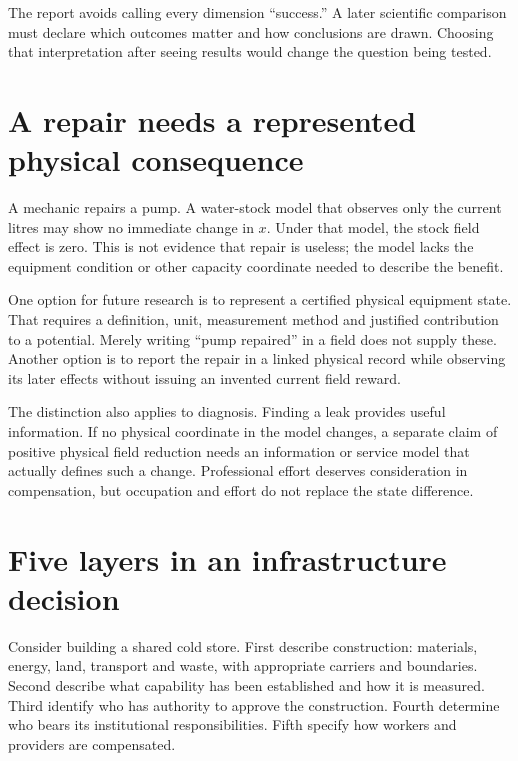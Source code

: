 The report avoids calling every dimension ``success.'' A later scientific comparison must declare which outcomes matter and how conclusions are drawn. Choosing that interpretation after seeing results would change the question being tested.


\section{A repair needs a represented physical consequence}
A mechanic repairs a pump. A water-stock model that observes only the current litres may show no immediate change in $x$. Under that model, the stock field effect is zero. This is not evidence that repair is useless; the model lacks the equipment condition or other capacity coordinate needed to describe the benefit.

One option for future research is to represent a certified physical equipment state. That requires a definition, unit, measurement method and justified contribution to a potential. Merely writing ``pump repaired'' in a field does not supply these. Another option is to report the repair in a linked physical record while observing its later effects without issuing an invented current field reward.

The distinction also applies to diagnosis. Finding a leak provides useful information. If no physical coordinate in the model changes, a separate claim of positive physical field reduction needs an information or service model that actually defines such a change. Professional effort deserves consideration in compensation, but occupation and effort do not replace the state difference.

\section{Five layers in an infrastructure decision}
Consider building a shared cold store. First describe construction: materials, energy, land, transport and waste, with appropriate carriers and boundaries. Second describe what capability has been established and how it is measured. Third identify who has authority to approve the construction. Fourth determine who bears its institutional responsibilities. Fifth specify how workers and providers are compensated.


